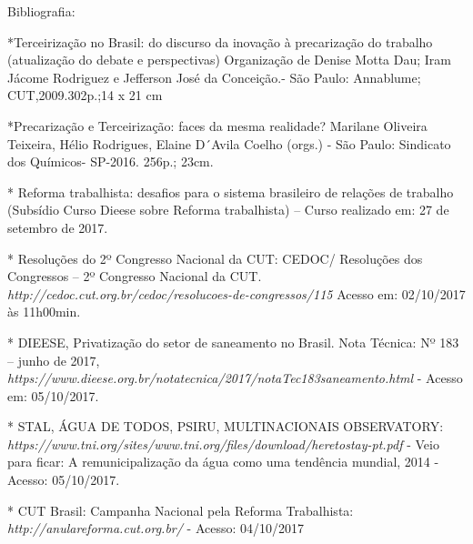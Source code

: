 Bibliografia:

*Terceirização no Brasil: do discurso da inovação à precarização do
trabalho (atualização do debate e perspectivas) Organização de Denise
Motta Dau; Iram Jácome Rodriguez e Jefferson José da Conceição.- São
Paulo: Annablume; CUT,2009.302p.;14 x 21 cm

*Precarização e Terceirização: faces da mesma realidade? Marilane
Oliveira Teixeira, Hélio Rodrigues, Elaine D´Avila Coelho (orgs.) - São
Paulo: Sindicato dos Químicos- SP-2016. 256p.; 23cm.

* Reforma trabalhista: desafios para o sistema brasileiro de relações de
trabalho (Subsídio Curso Dieese sobre Reforma trabalhista) -- Curso
realizado em: 27 de setembro de 2017.

* Resoluções do 2º Congresso Nacional da CUT: CEDOC/ Resoluções dos
Congressos -- 2º Congresso Nacional da CUT.
\emph{http://cedoc.cut.org.br/cedoc/resolucoes-de-congressos/115}
Acesso em: 02/10/2017 às 11h00min.

* DIEESE, Privatização do setor de saneamento no Brasil. Nota Técnica:
Nº 183 -- junho de 2017,
\emph{https://www.dieese.org.br/notatecnica/2017/notaTec183saneamento.html}
- Acesso em: 05/10/2017.

* STAL, ÁGUA DE TODOS, PSIRU, MULTINACIONAIS OBSERVATORY:
\emph{https://www.tni.org/sites/www.tni.org/files/download/heretostay-pt.pdf}
- Veio para ficar: A remunicipalização da água como uma tendência
mundial, 2014 - Acesso: 05/10/2017.

* CUT Brasil: Campanha Nacional pela Reforma Trabalhista:
\emph{http://anulareforma.cut.org.br/}
- Acesso: 04/10/2017
